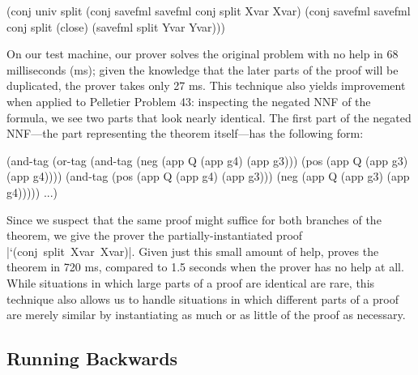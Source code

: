 \schemedisplayspace
\vspace{-2pt}
\begin{centering}
\begin{schemeresponse}
(conj univ split (conj savefml savefml conj split Xvar Xvar)
      (conj savefml savefml conj split (close) (savefml split Yvar Yvar)))
\end{schemeresponse}
\end{centering}
\vspace{-2pt}

\noindent On our test machine, our prover solves the original problem
with no help in 68 milliseconds (ms); given the knowledge that the
later parts of the proof will be duplicated, the prover takes only 27
ms. This technique also yields improvement when applied to Pelletier
Problem 43: inspecting the negated NNF of the formula, we see two
parts that look nearly identical. The first part of the negated
NNF---the part representing the theorem itself---has the following
form:

\schemedisplayspace
\vspace{-2pt}
\begin{centering}
\begin{schemeresponse}
(and-tag (or-tag (and-tag (neg (app Q (app g4) (app g3)))
              (pos (app Q (app g3) (app g4))))
         (and-tag (pos (app Q (app g4) (app g3)))
              (neg (app Q (app g3) (app g4))))) ...)
\end{schemeresponse}
\end{centering}
\vspace{-2pt}

\noindent Since we suspect that the same proof might suffice for both
branches of the theorem, we give the prover the partially-instantiated
proof \mbox{\schemeresult|`(conj split Xvar Xvar)|}. Given just this
small amount of help, \alphatapsp proves the theorem in 720 ms,
compared to 1.5 seconds when the prover has no help at all.  While
situations in which large parts of a proof are identical are rare,
this technique also allows us to handle situations in which different
parts of a proof are merely similar by instantiating as much or as
little of the proof as necessary.

\subsection{Running Backwards}\label{backwards}


